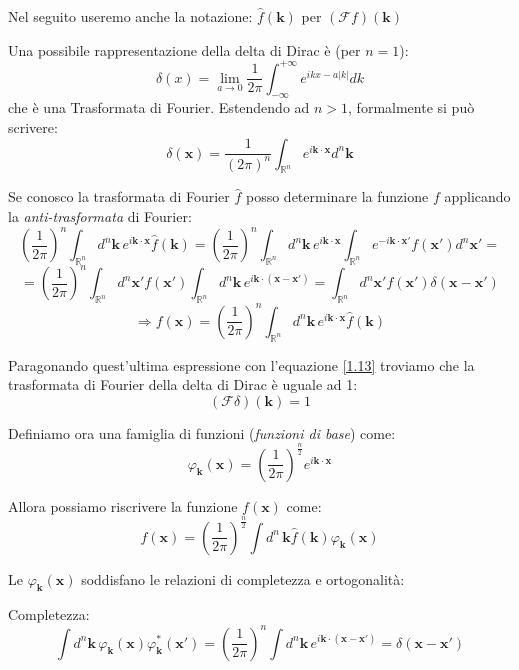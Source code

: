 \documentclass[a4paper,11pt]{report}
\newcommand{\vect}[1]{\boldsymbol{#1}}
\newcommand{\Rn}{\mathbb{R}^n}
\newcommand{\x}{\boldsymbol{x}}
\newcommand{\xp}{\boldsymbol{x}'}
\newcommand{\kk}{\boldsymbol{k}}
\begin{document}
Nel seguito useremo anche la notazione: $\hat{f}(\vect{k})$ per $(\mathcal{F} f)(\vect{k})$

Una possibile rappresentazione della delta di Dirac \`e (per $n=1$):
\[
\delta(x)=\lim_{a \to 0} \frac{1}{2\pi} \int_{-\infty}^{+\infty} e^{ikx-a\left | k\right |}dk
\]
che \`e una Trasformata di Fourier. 
Estendendo ad $n>1$, formalmente si pu\`o scrivere:
\begin{equation}
\delta(\vect{x})=\frac{1}{(2\pi)^n}\int_{\Rn}e^{i\vect{k}\cdot\vect{x}}d^n\vect{k}
\label{1.13}
\end{equation}

Se conosco la trasformata di Fourier $\hat{f}$ posso determinare la funzione $f$ applicando la \emph{anti-trasformata} di Fourier:
\[
\left(\frac{1}{2\pi}\right)^n\int_{\Rn}d^n\vect{k}\,e^{i\vect{k}\cdot\vect{x}}\hat{f}(\vect{k})=
\left(\frac{1}{2\pi}\right)^n \int_{\Rn}d^n\vect{k}\,e^{i\vect{k}\cdot\vect{x}}\int_{\Rn}e^{-i\vect{k}\cdot\vect{x}'}f(\vect{x}')d^n\vect{x}'=
\]
\[
= \left(\frac{1}{2\pi}\right)^n\int_{\Rn}d^n\vect{x}'f(\vect{x}')\int_{\Rn}d^n\vect{k}\,e^{i\vect{k}\cdot\left(\vect{x}-\vect{x}'\right)}=
\int_{\Rn}d^n\vect{x}'f(\vect{x}')\delta(\vect{x}-\vect{x}')
\]
\begin{equation}
\Rightarrow f(\vect{x})=\left(\frac{1}{2\pi}\right)^n\int_{\Rn}d^n\vect{k}\,e^{i\vect{k}\cdot\vect{x}}\hat{f}(\vect{k})
\end{equation}

Paragonando quest'ultima espressione con l'equazione \eqref{1.13} troviamo che la trasformata di Fourier della delta di Dirac \`e uguale ad 1:
\begin{equation}
(\mathcal{F} \delta)(\vect{k})=1
\end{equation}

Definiamo ora una famiglia di funzioni (\emph{funzioni di base}) come:
\begin{equation}
\varphi_{\vect{k}}(\vect{x})=\left(\frac{1}{2\pi}\right)^{\frac{n}{2}}e^{i\kk\cdot\x}
\end{equation}

Allora possiamo riscrivere la funzione $f(\x)$ come:
\[
f(\x)=\left(\frac{1}{2\pi}\right)^{\frac{n}{2}}\int d^n\,\kk\hat{f}(\kk)\varphi_{\kk}(\x)
\]

Le $\varphi_{\kk}(\x)$ soddisfano le relazioni di completezza e ortogonalit\`a:

Completezza:
\begin{equation}
\int d^n\kk \, \varphi_{\kk}(\x)\varphi_{\kk}^{*}(\xp)=\left(\frac{1}{2\pi}\right)^n\int d^n\kk\, e^{i\kk\cdot(\x-\xp)}=\delta(\x-\xp)
\end{equation}
\end{document}
